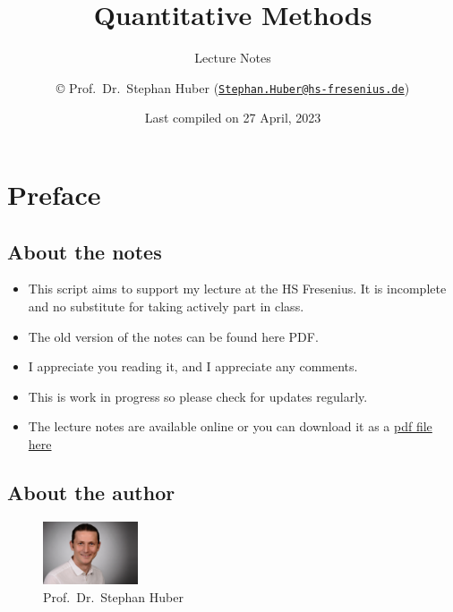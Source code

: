 \documentclass[
  12pt,
  oneside]{book}
\title{Quantitative Methods}
\subtitle{Lecture Notes}
\author{© Prof.~Dr.~Stephan Huber (\href{mailto:Stephan.Huber@hs-fresenius.de}{\nolinkurl{Stephan.Huber@hs-fresenius.de}})}
\date{Last compiled on 27 April, 2023}
\providecommand{\tightlist}{%
  \setlength{\itemsep}{0pt}\setlength{\parskip}{0pt}}
\theoremstyle{definition}
\theoremstyle{definition}
\theoremstyle{definition}
\theoremstyle{definition}
\theoremstyle{remark}
\begin{document}
\maketitle

{
\hypersetup{linkcolor=}
\setcounter{tocdepth}{2}
\tableofcontents
}
\hypertarget{preface}{%
\chapter*{Preface}\label{preface}}

\hypertarget{about-the-notes}{%
\section*{About the notes}\label{about-the-notes}}

\begin{itemize}
\tightlist
\item
  This script aims to support my lecture at the HS Fresenius. It is incomplete and no substitute for taking actively part in class.
\item
  The old version of the notes can be found here PDF.
\item
  I appreciate you reading it, and I appreciate any comments.
\item
  This is work in progress so please check for updates regularly.
\item
  The lecture notes are available online or you can download it as a \href{https://raw.githubusercontent.com/hubchev/hubchev.github.io/main/qm/_main.pdf}{pdf file here}
\end{itemize}

\hypertarget{about-the-author}{%
\section*{About the author}\label{about-the-author}}

\begin{figure}
\centering
\includegraphics[width=0.25\textwidth,height=\textheight]{fig/huber2.jpeg}
\caption[\label{fig:itsme} Prof.~Dr.~Stephan Huber]{\label{fig:itsme} Prof.~Dr.~Stephan Huber\footnotemark{}}
\end{figure}
\end{document}
